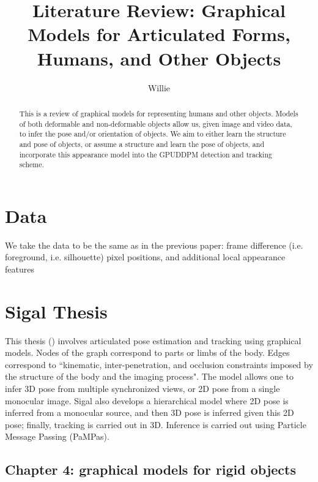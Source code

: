 \documentclass{article}
\begin{document}

\title{Literature Review: Graphical Models for Articulated Forms, Humans, and Other Objects}
\author{Willie}
\maketitle



\begin{abstract}
This is a review of graphical models for representing humans and other objects. Models of both deformable and non-deformable objects allow us, given image and video data, to infer the pose and/or orientation of objects. We aim to either learn the structure and pose of objects, or assume a structure and learn the pose of objects, and incorporate this appearance model into the GPUDDPM detection and tracking scheme.
\end{abstract}


\section{Data}
We take the data to be the same as in the previous paper: frame difference (i.e. foreground, i.e. silhouette) pixel positions, and additional local appearance features

\section{Sigal Thesis}

This thesis (\cite{Sigal:2008:CGM:1467812}) involves articulated pose estimation and tracking using graphical models.
Nodes of the graph correspond to parts or limbs of the body.
Edges correspond to ``kinematic, inter-penetration, and occlusion constraints imposed by the structure of the body and the imaging process".
The model allows one to infer 3D pose from multiple synchronized views, or 2D pose from a single monocular image. 
Sigal also develops a hierarchical model where 2D pose is inferred from a monocular source, and then 3D pose is inferred given this 2D pose; finally, tracking is carried out in 3D.
Inference is carried out using Particle Message Passing (PaMPas).


\subsection{Chapter 4: graphical models for rigid objects}
\end{document}
